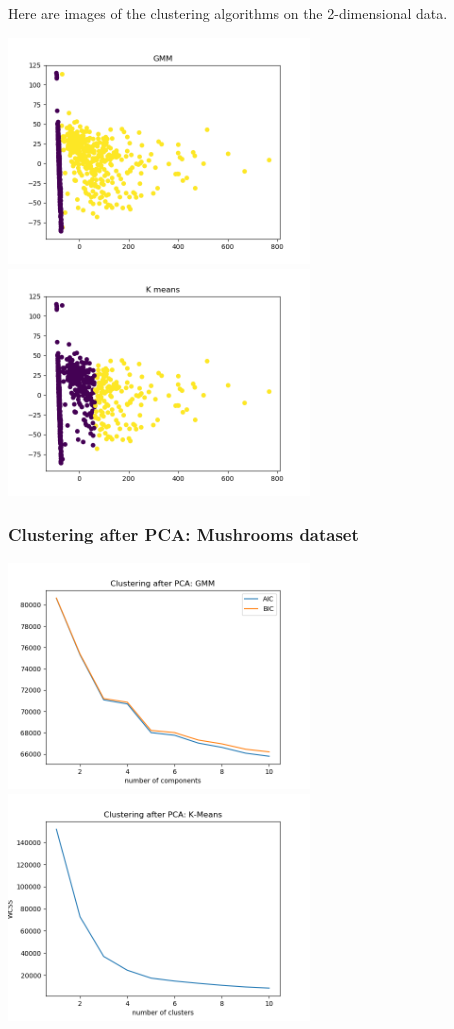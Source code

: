 \documentclass[11pt]{article}
\begin{document}
            Here are images of the clustering algorithms on the 2-dimensional data.

            \includegraphics[width=8cm]{../pima/clustering2/cluster_gmm_pca.png}
            \includegraphics[width=8cm]{../pima/clustering2/cluster_km_pca.png}

            \subsubsection{Clustering after PCA: Mushrooms dataset}
            
            \includegraphics[width=8cm]{../mushrooms/clustering2/gmm_pca.png}
            \includegraphics[width=8cm]{../mushrooms/clustering2/km_pca.png}
\end{document}
